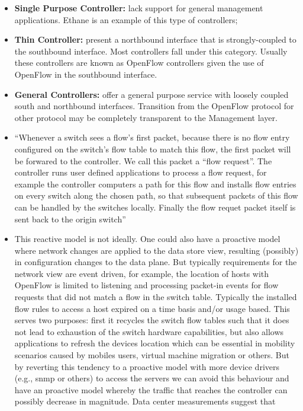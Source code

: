 \documentclass[12pt,openright,twoside]{report}
\begin{document}
\begin{itemize}
\begin{itemize}
\item[] \textbf{Single Purpose Controller:} lack support for general management
  applications. Ethane is an example of this type of controllers; 
\item[] \textbf{Thin Controller:} present a northbound interface that is
  strongly-coupled to the southbound interface. Most controllers fall
  under this category. Usually these controllers are known as OpenFlow controllers given the use of OpenFlow in the southbound interface.  
\item[] \textbf{General Controllers:} offer a general purpose service with loosely
  coupled south and northbound interfaces. Transition from the OpenFlow protocol for
  other protocol may  be completely transparent to the Management layer.
\end{itemize}


\begin{itemize}
\item ``Whenever a switch sees a flow's first packet, because there is no flow entry configured on the switch's flow table to match this flow, the first packet will be forwared to the controller. We call this packet a ``flow request''. The controller runs user defined applications to process a flow request, for example the controller computers a path for this flow and installs flow entries on every switch along the chosen path, so that subsequent packets of this flow can be handled by the switches locally. Finally the flow requet packet itself is sent back to the origin switch'' 


\item This reactive model is not ideally. One could also have a proactive model where network changes are applied to the data store view,  resulting (possibly) in configuration changes to the data plane. But typically requirements for the network view are event driven, for example, the location of hosts with OpenFlow is limited to listening and processing packet-in events for flow requests that did not match a flow in the switch table. Typically the installed flow rules to access a host expired on a time basis and/or usage based. This serves two purposes: first it recycles the switch flow tables such that it does not lead to exhaustion of the switch hardware capabilities, but also allows applications to refresh the devices location which can be essential in mobility scenarios caused by mobiles users, virtual machine migration or others. 
But by reverting this tendency to a proactive model with more device drivers (e.g., snmp or others) to access the servers we can avoid this behaviour and have an proactive model whereby the traffic that reaches the controller can possibly decrease in magnitude. Data center measurements suggest that 


\end{itemize}
\end{itemize}
\end{document}
